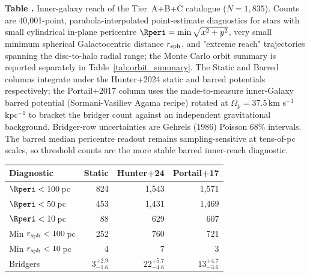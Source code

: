 \begin{center}
\label{tab:reach}
\begin{minipage}{\linewidth}
\small\textbf{Table \thetable.} Inner-galaxy reach of the Tier~A+B+C
catalogue ($N=1{,}835$). Counts are 40{,}001-point, parabola-interpolated
point-estimate diagnostics for stars
with small cylindrical in-plane pericentre $\Rperi=\min\sqrt{x^2+y^2}$,
very small minimum spherical Galactocentric distance $r_{\rm sph}$, and
"extreme reach" trajectories spanning the disc-to-halo radial range; the
Monte Carlo orbit summary is reported separately in
Table~\ref{tab:orbit_summary}. The Static and Barred columns integrate
under the Hunter+2024 static and barred potentials respectively; the
Portail+2017 column uses the made-to-measure inner-Galaxy barred
potential (Sormani-Vasiliev Agama recipe) rotated at $\Omega_p=37.5$\,km
s$^{-1}$ kpc$^{-1}$ to bracket the bridger count against an independent
gravitational background. Bridger-row uncertainties are Gehrels (1986)
Poisson 68\% intervals. The barred median pericentre readout remains
sampling-sensitive at tens-of-pc scales, so threshold counts are the more
stable barred inner-reach diagnostic.
\end{minipage}
\vspace{0.4ex}

\small
\setlength{\tabcolsep}{0pt}
\begin{tabular*}{\linewidth}{@{\extracolsep{\fill}}lrrr@{}}
\hline\hline
Diagnostic & Static & Hunter+24 & Portail+17 \\
\hline
$\Rperi<100$\,pc          & 824                & 1{,}543            & 1{,}571 \\
$\Rperi<50$\,pc           & 453                & 1{,}431            & 1{,}469 \\
$\Rperi<10$\,pc           & 88                 & 629                & 607 \\
Min $r_{\rm sph}<100$\,pc & 252                & 760                & 721 \\
Min $r_{\rm sph}<10$\,pc  & 4                  & 7                  & 3 \\
Bridgers                  & $3^{+2.9}_{-1.6}$  & $22^{+5.7}_{-4.6}$ & $13^{+4.7}_{-3.6}$ \\
\hline
\end{tabular*}
\end{center}

